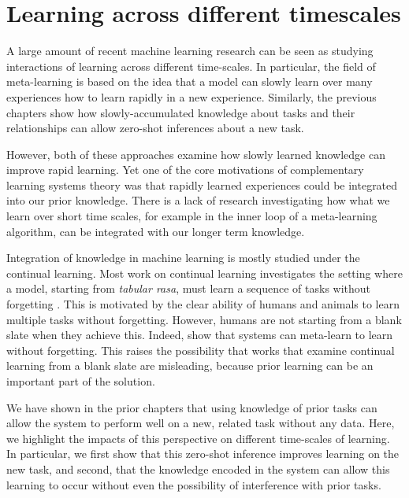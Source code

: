 \chapter{Learning across different timescales} \label{chapter:timescales}

A large amount of recent machine learning research can be seen as studying interactions of learning across different time-scales. In particular, the field of meta-learning is based on the idea that a model can slowly learn over many experiences how to learn rapidly in a new experience. Similarly, the previous chapters show how slowly-accumulated knowledge about tasks and their relationships can allow zero-shot inferences about a new task. \par 

However, both of these approaches examine how slowly learned knowledge can improve rapid learning. Yet one of the core motivations of complementary learning systems theory was that rapidly learned experiences could be integrated into our prior knowledge. There is a lack of research investigating how what we learn over short time scales, for example in the inner loop of a meta-learning algorithm, can be integrated with our longer term knowledge. \par 

Integration of knowledge in machine learning is mostly studied under the continual learning. Most work on continual learning investigates the setting where a model, starting from \emph{tabular rasa}, must learn a sequence of tasks without forgetting \citep{Ven2018, Atkinson2018}. This is motivated by the clear ability of humans and animals to learn multiple tasks without forgetting. However, humans are not starting from a blank slate when they achieve this. Indeed, \citep{Velez2017} show that systems can meta-learn to learn without forgetting. This raises the possibility that works that examine continual learning from a blank slate are misleading, because prior learning can be an important part of the solution. \par 

We have shown in the prior chapters that using knowledge of prior tasks can allow the system to perform well on a new, related task without any data. Here, we highlight the impacts of this perspective on different time-scales of learning. In particular, we first show that this zero-shot inference improves learning on the new task, and second, that the knowledge encoded in the system can allow this learning to occur without even the possibility of interference with prior tasks. \par  

